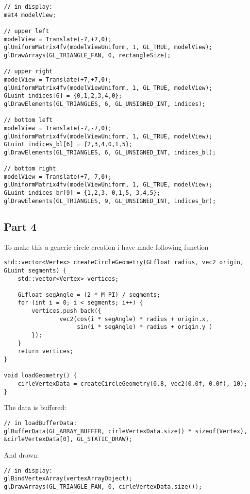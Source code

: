 \begin{lstlisting}
// in display:
mat4 modelView;

// upper left
modelView = Translate(-7,+7,0);
glUniformMatrix4fv(modelViewUniform, 1, GL_TRUE, modelView);
glDrawArrays(GL_TRIANGLE_FAN, 0, rectangleSize);

// upper right
modelView = Translate(+7,+7,0);
glUniformMatrix4fv(modelViewUniform, 1, GL_TRUE, modelView);
GLuint indices[6] = {0,1,2,3,4,0};
glDrawElements(GL_TRIANGLES, 6, GL_UNSIGNED_INT, indices);

// bottom left
modelView = Translate(-7,-7,0);
glUniformMatrix4fv(modelViewUniform, 1, GL_TRUE, modelView);
GLuint indices_bl[6] = {2,3,4,0,1,5};
glDrawElements(GL_TRIANGLES, 6, GL_UNSIGNED_INT, indices_bl);

// bottom right
modelView = Translate(+7,-7,0);
glUniformMatrix4fv(modelViewUniform, 1, GL_TRUE, modelView);
GLuint indices_br[9] = {1,2,3, 0,1,5, 3,4,5};
glDrawElements(GL_TRIANGLES, 9, GL_UNSIGNED_INT, indices_br);
\end{lstlisting}


\subsection{Part 4}

To make this a generic circle creation i have made following function

\begin{lstlisting}
std::vector<Vertex> createCircleGeometry(GLfloat radius, vec2 origin, GLuint segments) {
	std::vector<Vertex> vertices;

	GLfloat segAngle = (2 * M_PI) / segments;
	for (int i = 0; i < segments; i++) {
		vertices.push_back({
				vec2(cos(i * segAngle) * radius + origin.x,
					 sin(i * segAngle) * radius + origin.y )
		});
	}
	return vertices;
}

void loadGeometry() {
	cirleVertexData = createCircleGeometry(0.8, vec2(0.0f, 0.0f), 10);
}
\end{lstlisting}

The data is buffered:
\begin{lstlisting}
// in loadBufferData:
glBufferData(GL_ARRAY_BUFFER, cirleVertexData.size() * sizeof(Vertex), &cirleVertexData[0], GL_STATIC_DRAW);
\end{lstlisting}

And drawn:
\begin{lstlisting}
// in display:
glBindVertexArray(vertexArrayObject);
glDrawArrays(GL_TRIANGLE_FAN, 0, cirleVertexData.size());
\end{lstlisting}

